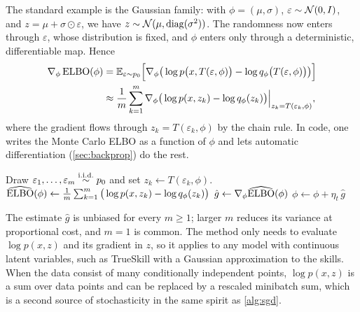The standard example is the Gaussian family: with $\phi=(\mu,\sigma)$, $\varepsilon\sim\mathcal{N}(0,I)$, and $z=\mu+\sigma\odot\varepsilon$, we have $z\sim\mathcal{N}(\mu,\operatorname{diag}(\sigma^2))$. The randomness now enters through $\varepsilon$, whose distribution is fixed, and $\phi$ enters only through a deterministic, differentiable map. Hence
\begin{equation}\label{eq:reparam-grad}
\begin{aligned}
\nabla_\phi\operatorname{ELBO}(\phi)&=\mathbb{E}_{\varepsilon\sim p_0}\Big[\nabla_\phi\big(\log p\big(x,T(\varepsilon,\phi)\big)-\log q_\phi\big(T(\varepsilon,\phi)\big)\big)\Big]\\
&\approx\frac1m\sum_{k=1}^m\nabla_\phi\big(\log p(x,z_k)-\log q_\phi(z_k)\big)\Big|_{z_k=T(\varepsilon_k,\phi)},
\end{aligned}
\end{equation}
where the gradient flows through $z_k=T(\varepsilon_k,\phi)$ by the chain rule. In code, one writes the Monte Carlo ELBO as a function of $\phi$ and lets automatic differentiation (\cref{sec:backprop}) do the rest.

\begin{algorithm}[H]
\caption{Stochastic Variational Inference with Reparameterization}\label{alg:svi}
\begin{algorithmic}[1]
  \State Draw $\varepsilon_1,\dots,\varepsilon_m\stackrel{\mathrm{i.i.d.}}{\sim} p_0$ and set $z_k\gets T(\varepsilon_k,\phi)$.
  \State $\widehat{\operatorname{ELBO}}(\phi)\gets\frac1m\sum_{k=1}^m\big(\log p(x,z_k)-\log q_\phi(z_k)\big)$
  \State $\hat g\gets\nabla_\phi\widehat{\operatorname{ELBO}}(\phi)$ 
  \State $\phi\gets\phi+\eta_t\,\hat g$ 
\EndFor
{}
\end{algorithmic}
\end{algorithm}

The estimate $\hat g$ is unbiased for every $m\ge1$; larger $m$ reduces its variance at proportional cost, and $m=1$ is common. The method only needs to evaluate $\log p(x,z)$ and its gradient in $z$, so it applies to any model with continuous latent variables, such as TrueSkill with a Gaussian approximation to the skills. When the data consist of many conditionally independent points, $\log p(x,z)$ is a sum over data points and can be replaced by a rescaled minibatch sum, which is a second source of stochasticity in the same spirit as \cref{alg:sgd}.

